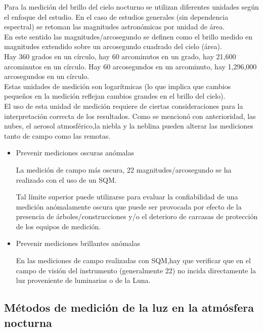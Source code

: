  Para la medición del brillo del cielo nocturno se utilizan diferentes unidades según el enfoque del estudio. En el caso de estudios generales (sin dependencia espectral) se retoman las magnitudes astronómicas por unidad de área.\\
 
En este sentido las magnitudes/arcosegundo se definen como el brillo medido en magnitudes extendido sobre un arcosegundo cuadrado del cielo (área).\\

Hay 360 grados en un círculo, hay 60 arcominutos en un grado, hay 21,600 arcominutos en un círculo. Hay 60 arcosegundos en un arcominuto, hay 1,296,000 arcosegundos en un círculo.\\

Estas unidades de medición son logarítmicas (lo que implica que cambios pequeños en la medición reflejan cambios grandes en el brillo del cielo).\\

El uso de esta unidad de medición requiere de ciertas consideraciones para la interpretación correcta de los resultados. Como se mencionó con anterioridad, las nubes, el aerosol atmosférico,la niebla y la neblina pueden alterar las mediciones tanto de campo como las remotas.

\begin{itemize}

    \item Prevenir mediciones oscuras anómalas
    
    La medición de campo más oscura, 22 magnitudes/arcosegundo se ha realizado con el uso de un SQM.
           
    Tal límite superior puede utilizarse para evaluar la confiabilidad de una medición anómalamente oscura que puede ser provocada por efecto de la presencia de  árboles/construcciones y/o el deterioro de carcasas de protección de los equipos de medición. 
    
    
    \item Prevenir mediciones brillantes anómalas
    
    En las mediciones de campo realizadas con SQM,hay que verificar que en el campo de visión del instrumento (generalmente 22\grad) no incida directamente la luz proveniente de luminarias o de la Luna.
    
    
 \end{itemize}
 
\subsection{Métodos de medición de la luz en la atmósfera nocturna}

